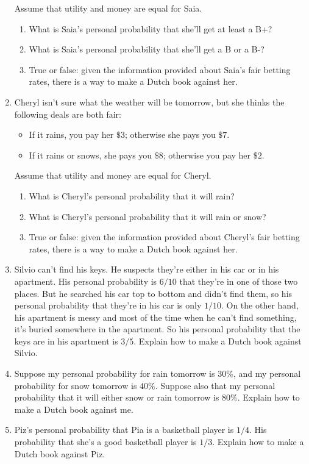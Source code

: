 \documentclass[justified]{tufte-book}
\providecommand{\tightlist}{%
  \setlength{\itemsep}{0pt}\setlength{\parskip}{0pt}}
\theoremstyle{definition}
\theoremstyle{definition}
\theoremstyle{definition}
\theoremstyle{remark}
\begin{document}
\begin{enumerate}
  Assume that utility and money are equal for Saia.

  \begin{enumerate}
  \def\labelenumii{\alph{enumii}.}
  \tightlist
  \item
    What is Saia's personal probability that she'll get at least a B+?
  \item
    What is Saia's personal probability that she'll get a B or a B-?
  \item
    True or false: given the information provided about Saia's fair betting rates, there is a way to make a Dutch book against her.
  \end{enumerate}
\item
  Cheryl isn't sure what the weather will be tomorrow, but she thinks the following deals are both fair:

  \begin{itemize}
  \tightlist
  \item
    If it rains, you pay her \(\$3\); otherwise she pays you \(\$7\).
  \item
    If it rains or snows, she pays you \(\$8\); otherwise you pay her \(\$2\).
  \end{itemize}

  Assume that utility and money are equal for Cheryl.

  \begin{enumerate}
  \def\labelenumii{\alph{enumii}.}
  \tightlist
  \item
    What is Cheryl's personal probability that it will rain?
  \item
    What is Cheryl's personal probability that it will rain or snow?
  \item
    True or false: given the information provided about Cheryl's fair betting rates, there is a way to make a Dutch book against her.
  \end{enumerate}
\item
  Silvio can't find his keys. He suspects they're either in his car or in his apartment. His personal probability is \(6/10\) that they're in one of those two places. But he searched his car top to bottom and didn't find them, so his personal probability that they're in his car is only \(1/10\). On the other hand, his apartment is messy and most of the time when he can't find something, it's buried somewhere in the apartment. So his personal probability that the keys are in his apartment is \(3/5\). Explain how to make a Dutch book against Silvio.
\item
  Suppose my personal probability for rain tomorrow is \(30\%\), and my personal probability for snow tomorrow is \(40\%\). Suppose also that my personal probability that it will either snow or rain tomorrow is \(80\%\). Explain how to make a Dutch book against me.
\item
  Piz's personal probability that Pia is a basketball player is \(1/4\). His probability that she's a good basketball player is \(1/3\). Explain how to make a Dutch book against Piz.
\end{enumerate}
\end{document}
